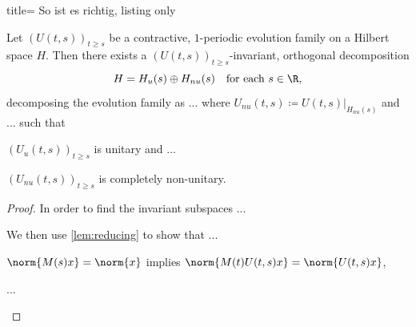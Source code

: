 \begin{tcblisting}{title= So ist es richtig, listing only}
\begin{theorem}\label{thm:zerlegung}
Let $(U(t,s))_{t \geq s}$ be a contractive, $1$-periodic evolution family on a Hilbert space $H$.
Then there exists a $(U(t,s))_{t \geq s}$-invariant, orthogonal decomposition
\[
H = H_u(s) \oplus H_{nu}(s) \quad \text{for each } s \in \R ,
\]
decomposing the evolution family as ...
where $U_{nu}(t,s) \coloneqq U(t,s)|_{H_{nu}(s)}$ and ... such that
\begin{myenumerate}
\item
$(U_u(t,s))_{t \geq s}$ is unitary and ...
\item
$(U_{nu}(t,s))_{t \geq s}$ is completely non-unitary.
\end{myenumerate}
\end{theorem}

\begin{proof}
In order to find the invariant subspaces ...

We then use \cref{lem:reducing} to show that ...
\begin{myequivalent}
\item
$\norm{M(s)x} = \norm{x}$ implies $\norm{M(t)U(t,s)x} = \norm{U(t,s)x}$,
\item
...
\end{myequivalent}
\end{proof}
\end{tcblisting}
